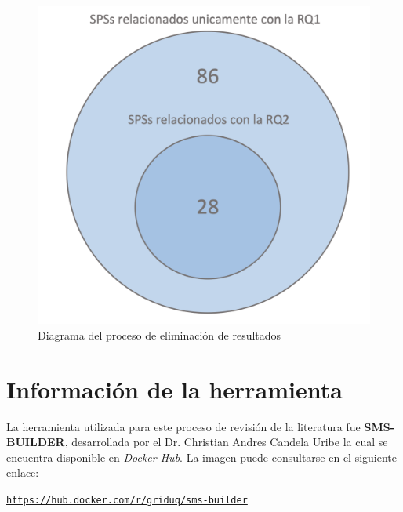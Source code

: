\begin{figure}[H]
	\centering
	\includegraphics[scale=0.9] {tablas-images/sms/plot-venn-RQs.png}
	\caption{Diagrama del proceso de eliminación de resultados}\label{fig:plot-venn-RQs}
\end{figure}



\section{Información de la herramienta}

\noindent
La herramienta utilizada para este proceso de revisión de la literatura fue \textbf{SMS-BUILDER}, desarrollada por el Dr. Christian Andres Candela Uribe la cual se encuentra disponible en \textit{Docker Hub}. La imagen puede consultarse en el siguiente enlace:

\begin{center}
	\href{https://hub.docker.com/r/griduq/sms-builder}{\texttt{https://hub.docker.com/r/griduq/sms-builder}}
\end{center}



